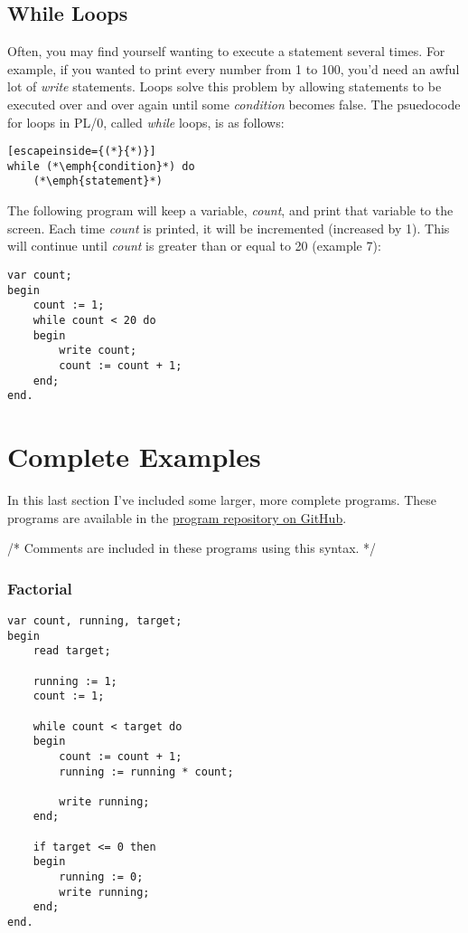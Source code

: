 \documentclass[12pt]{memoir}
\begin{document}
\subsection*{While Loops}
Often, you may find yourself wanting to execute a statement several times. For example,
if you wanted to print every number from 1 to 100, you'd need an awful lot of \emph{write}
statements. Loops solve this problem by allowing statements to be executed over and over
again until some \emph{condition} becomes false. The psuedocode for loops in PL/0,
called \emph{while} loops, is as follows:
\begin{lstlisting}[escapeinside={(*}{*)}]
while (*\emph{condition}*) do
    (*\emph{statement}*)
\end{lstlisting}
The following program will keep a variable, \emph{count}, and print that variable to the screen.
Each time \emph{count} is printed, it will be incremented (increased by 1). This will
continue until \emph{count} is greater than or equal to 20 (example 7):
\begin{lstlisting}
var count;
begin
    count := 1;
    while count < 20 do
    begin
        write count;
        count := count + 1;
    end;
end.
\end{lstlisting}

\section*{Complete Examples}
In this last section I've included some larger, more complete programs. These programs
are available in the \href{https://www.github.com/tgsachse/plum}{program repository on GitHub}.

/* Comments are included in these programs using this syntax. */

\subsubsection*{Factorial}
\begin{lstlisting}
var count, running, target;
begin
    read target;

    running := 1;
    count := 1;

    while count < target do
    begin
        count := count + 1;
        running := running * count;
        
        write running;
    end;

    if target <= 0 then
    begin
        running := 0;
        write running;
    end;
end.
\end{lstlisting}
\end{document}
